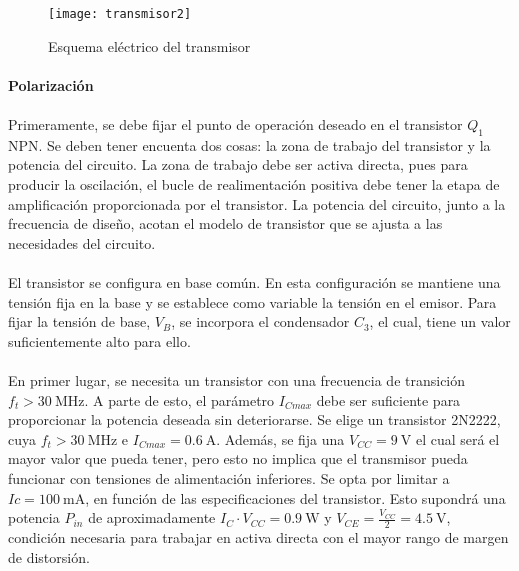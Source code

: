 \begin{figure}[h]
    \centering
    \texttt{[image: transmisor2]}
    \caption{Esquema el\'ectrico del transmisor}
    \label{fig:tx}
\end{figure}

\paragraph{Polarizaci\'on} %
\paragraph{}
Primeramente, se debe fijar el punto de operación deseado en el transistor $Q_1$ NPN. Se deben tener encuenta dos cosas: la zona de trabajo del transistor y la potencia del circuito. La zona de trabajo debe ser activa directa, pues para producir la oscilación, el bucle de realimentación positiva debe tener la etapa de amplificación proporcionada por el transistor. La potencia del circuito, junto a la frecuencia de diseño, acotan el modelo de transistor que se ajusta a las necesidades del circuito.
\paragraph{}
El transistor se configura en base com\'un. En esta configuraci\'on se mantiene una tensión fija en la base y se establece como variable la tensi\'on en el emisor. Para fijar la tensión de base, $V_B$, se incorpora el condensador $C_3$, el cual, tiene un valor suficientemente alto para ello.
\paragraph{}
En primer lugar, se necesita un transistor con una frecuencia de transición $f_t > \SI{30}{\mega\hertz}$. 
A parte de esto, el parámetro $I_{Cmax}$ debe ser suficiente para proporcionar la potencia deseada sin deteriorarse. Se elige un transistor 2N2222, cuya $f_t > \SI{30}{\mega\hertz}$ e $I_{Cmax} = \SI{0.6}{\ampere}$. Adem\'as, se fija una $V_{CC} = \SI{9}{\volt}$ el cual ser\'a el mayor valor que pueda tener, pero esto no implica que el transmisor pueda funcionar con tensiones de alimentaci\'on inferiores. Se opta por limitar a $Ic = \SI{100}{\milli\ampere}$, en funci\'on de las especificaciones del transistor. Esto supondr\'a una potencia $P_{in}$ de aproximadamente $I_C \cdot V_{CC} = \SI{0.9}{\watt}$ y $V_{CE} = \frac{V_{CC}}{2} = \SI{4.5}{\volt}$, condici\'on necesaria para trabajar en activa directa con el mayor rango de margen de distorsi\'on. 
